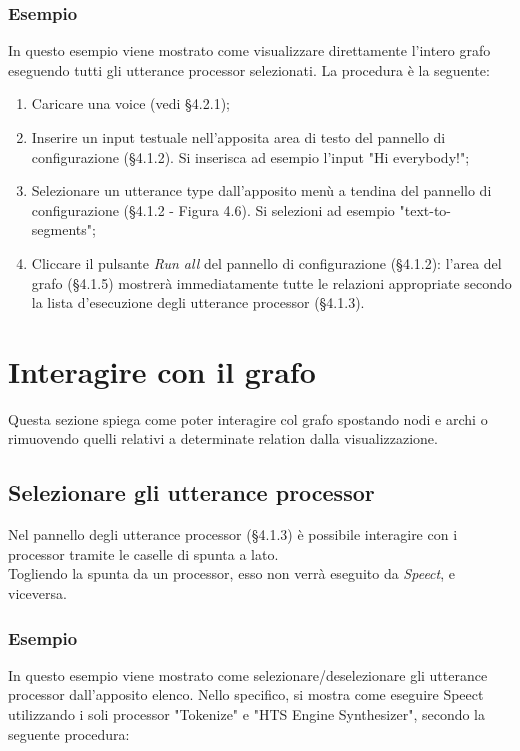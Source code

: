 \documentclass[openany,12pt,a4paper]{report}
\begin{document}
	\subsubsection*{Esempio}
	
	In questo esempio viene mostrato come visualizzare direttamente l'intero grafo eseguendo tutti gli utterance processor selezionati. La procedura è la seguente:
	
	\begin{enumerate}
		\item Caricare una voice (vedi §4.2.1);
		\item Inserire un input testuale nell'apposita area di testo del pannello di configurazione (§4.1.2). Si inserisca ad esempio l'input "Hi everybody!";
		\item Selezionare un utterance type dall'apposito menù a tendina del pannello di configurazione (§4.1.2 - Figura 4.6). Si selezioni ad esempio "text-to-segments";
		\item Cliccare il pulsante \textit{Run all} del pannello di configurazione (§4.1.2): l'area del grafo (§4.1.5) mostrerà immediatamente tutte le relazioni appropriate secondo la lista d'esecuzione degli utterance processor (§4.1.3).
	\end{enumerate}

	\section{Interagire con il grafo}
	Questa sezione spiega come poter interagire col grafo spostando nodi e archi o rimuovendo quelli relativi a determinate relation dalla visualizzazione.
	
	\subsection{Selezionare gli utterance processor}
	Nel pannello degli utterance processor (§4.1.3) è possibile interagire con i processor tramite le caselle di spunta a lato.\\
	Togliendo la spunta da un processor, esso non verrà eseguito da \textit{Speect}, e viceversa.
	
	\subsubsection*{Esempio}
	
	In questo esempio viene mostrato come selezionare/deselezionare gli utterance processor dall'apposito elenco. Nello specifico, si mostra come eseguire Speect utilizzando i soli processor "Tokenize" e "HTS Engine Synthesizer", secondo la seguente procedura:
	
\end{document}
